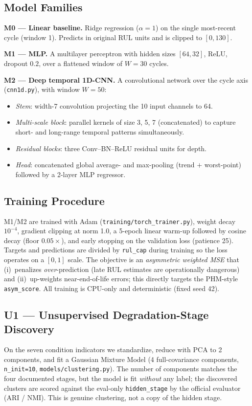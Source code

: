 \documentclass[11pt,a4paper]{article}
\newcommand{\code}[1]{\texttt{\small #1}}
\begin{document}
\subsection{Model Families}
\textbf{M0 --- Linear baseline.} Ridge regression ($\alpha=1$) on the single
most-recent cycle (window 1). Predicts in original RUL units and is clipped to
$[0,130]$.

\textbf{M1 --- MLP.} A multilayer perceptron with hidden sizes $[64,32]$,
ReLU, dropout $0.2$, over a flattened window of $W=30$ cycles.

\textbf{M2 --- Deep temporal 1D-CNN.} A convolutional network over the cycle
axis (\code{cnn1d.py}), with window $W=50$:
\begin{itemize}[nosep]
  \item \emph{Stem}: width-7 convolution projecting the 10 input channels to 64.
  \item \emph{Multi-scale block}: parallel kernels of size 3, 5, 7 (concatenated)
        to capture short- and long-range temporal patterns simultaneously.
  \item \emph{Residual blocks}: three Conv--BN--ReLU residual units for depth.
  \item \emph{Head}: concatenated global average- and max-pooling
        (trend $+$ worst-point) followed by a 2-layer MLP regressor.
\end{itemize}

\subsection{Training Procedure}
M1/M2 are trained with Adam (\code{training/torch\_trainer.py}), weight decay
$10^{-4}$, gradient clipping at norm 1.0, a 5-epoch linear warm-up followed by
cosine decay (floor $0.05\times$), and early stopping on the validation loss
(patience 25). Targets and predictions are divided by \code{rul\_cap} during
training so the loss operates on a $[0,1]$ scale. The objective is an
\emph{asymmetric weighted MSE} that (i)~penalizes \emph{over}-prediction (late
RUL estimates are operationally dangerous) and (ii)~up-weights near-end-of-life
errors; this directly targets the PHM-style \code{asym\_score}. All training is
CPU-only and deterministic (fixed seed 42).

\subsection{U1 --- Unsupervised Degradation-Stage Discovery}
On the seven condition indicators we standardize, reduce with PCA to 2
components, and fit a Gaussian Mixture Model (4 full-covariance components,
\code{n\_init=10}, \code{models/clustering.py}). The number of components matches
the four documented stages, but the model is fit \emph{without} any label; the
discovered clusters are scored against the eval-only \code{hidden\_stage} by the
official evaluator (ARI / NMI). This is genuine clustering, not a copy of the
hidden stage.
\end{document}
